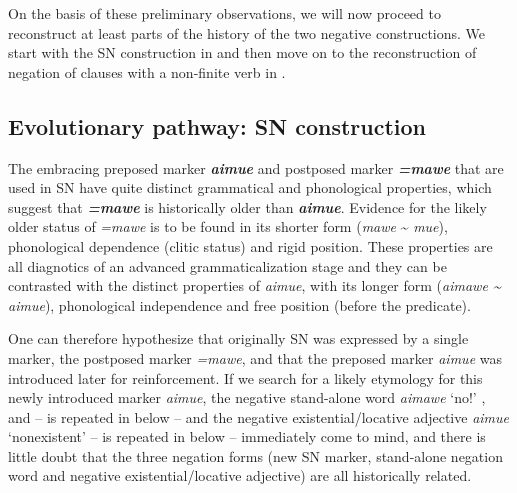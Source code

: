 \documentclass[output=paper]{langsci/langscibook}
\begin{document}
On the basis of these preliminary observations, we will now proceed to
reconstruct at least parts of the history of the two negative
constructions. We start with the SN construction in
 and then move on to the reconstruction of
negation of clauses with a non-finite verb in .

\subsection{Evolutionary pathway: SN construction}\label{sec:tacana-10.1}

The embracing preposed marker \textbf{\textit{aimue}} and postposed marker
\textbf{\textit{=mawe}} that are used in SN have quite distinct grammatical
and phonological properties, which suggest that \textbf{\textit{=mawe}} is historically older than \textbf{\textit{aimue}}. Evidence for the likely older status of \textit{=mawe} is to be found in its shorter form (\textit{mawe} {\textasciitilde} \textit{mue}), phonological dependence (clitic status) and rigid position. These properties are all diagnotics of an advanced grammaticalization stage and they can be contrasted with the distinct properties of \textit{aimue}, with its longer form (\textit{aimawe {\textasciitilde} aimue}), phonological independence and free position (before the predicate).

One can therefore hypothesize that originally SN was expressed by a
single marker, the postposed marker \textit{=mawe}, and that the preposed
marker \textit{aimue} was introduced later for reinforcement. If we search
for a likely etymology for this newly introduced marker \textit{aimue}, the
negative stand-alone word \textit{aimawe} `no!'
,  and
 --  is repeated in
 below -- and the negative
existential\slash locative adjective \textit{aimue} `nonexistent'
 –  is repeated in
 below – immediately come to mind, and there is little doubt that the three negation forms (new SN marker, stand-alone negation word and negative existential\slash locative adjective) are all historically related.
\end{document}
